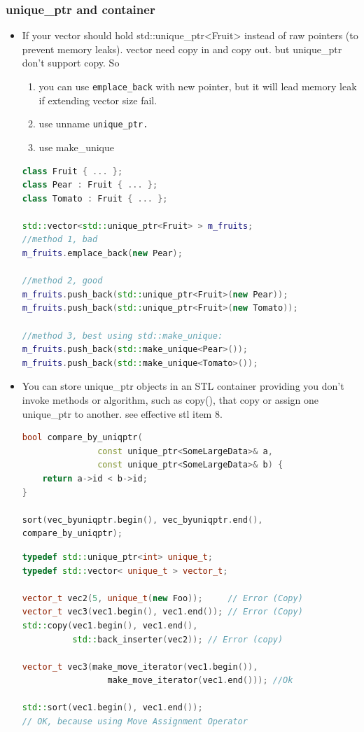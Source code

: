 \documentclass[a4paper,12pt,twoside]{book}
\begin{document}
\subsubsection{unique\_ptr and container}
\begin{itemize}

\item If your vector should hold std::unique\_ptr<Fruit> instead of raw pointers (to prevent memory leaks). vector need copy in and copy out. but unique\_ptr don't support copy. So 
\begin{enumerate}
	\item you can use \texttt{emplace\_back} with new pointer, but it will lead memory leak if extending vector size fail.
	\item use unname \texttt{unique\_ptr.}
	\item use make\_unique
\end{enumerate}
\begin{lstlisting}[frame=single, language=c++]
class Fruit { ... };
class Pear : Fruit { ... };
class Tomato : Fruit { ... };

std::vector<std::unique_ptr<Fruit> > m_fruits;
//method 1, bad
m_fruits.emplace_back(new Pear);

//method 2, good
m_fruits.push_back(std::unique_ptr<Fruit>(new Pear));
m_fruits.push_back(std::unique_ptr<Fruit>(new Tomato));

//method 3, best using std::make_unique:
m_fruits.push_back(std::make_unique<Pear>());
m_fruits.push_back(std::make_unique<Tomato>());
\end{lstlisting}

\item You can store unique\_ptr objects in an STL container providing you don't invoke methods or algorithm, such as copy(), that copy or assign one unique\_ptr to another.  see effective stl item 8.

\begin{lstlisting}[frame=single, language=c++]
bool compare_by_uniqptr(
               const unique_ptr<SomeLargeData>& a,
               const unique_ptr<SomeLargeData>& b) {
    return a->id < b->id;
}

sort(vec_byuniqptr.begin(), vec_byuniqptr.end(),
compare_by_uniqptr);
\end{lstlisting}


\begin{lstlisting}[frame=single, language=c++]
typedef std::unique_ptr<int> unique_t;
typedef std::vector< unique_t > vector_t;

vector_t vec2(5, unique_t(new Foo));     // Error (Copy)
vector_t vec3(vec1.begin(), vec1.end()); // Error (Copy)
std::copy(vec1.begin(), vec1.end(),
          std::back_inserter(vec2)); // Error (copy)

vector_t vec3(make_move_iterator(vec1.begin()),
                 make_move_iterator(vec1.end())); //Ok

std::sort(vec1.begin(), vec1.end());
// OK, because using Move Assignment Operator
\end{lstlisting}

\end{itemize}
\end{document}
